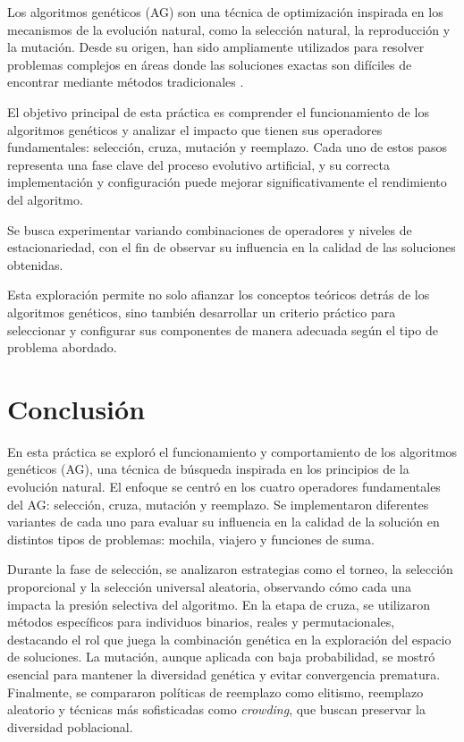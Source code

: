 \documentclass[12pt,twoside]{report}
\begin{document}
	Los algoritmos genéticos (AG) son una técnica de optimización inspirada en los mecanismos de la evolución natural, como la selección natural, la reproducción y la mutación. Desde su origen, han sido ampliamente utilizados para resolver problemas complejos en áreas donde las soluciones exactas son difíciles de encontrar mediante métodos tradicionales \cite{gas}.
	
	El objetivo principal de esta práctica es comprender el funcionamiento de los algoritmos genéticos y analizar el impacto que tienen sus operadores fundamentales: selección, cruza, mutación y reemplazo. Cada uno de estos pasos representa una fase clave del proceso evolutivo artificial, y su correcta implementación y configuración puede mejorar significativamente el rendimiento del algoritmo.
	
	Se busca experimentar variando combinaciones de operadores y niveles de estacionariedad, con el fin de observar su influencia en la calidad de las soluciones obtenidas.
	
	Esta exploración permite no solo afianzar los conceptos teóricos detrás de los algoritmos genéticos, sino también desarrollar un criterio práctico para seleccionar y configurar sus componentes de manera adecuada según el tipo de problema abordado.
	
	
	
	
	
	
	
	
	
	

	\chapter*{Conclusión}
	
	En esta práctica se exploró el funcionamiento y comportamiento de los algoritmos genéticos (AG), una técnica de búsqueda inspirada en los principios de la evolución natural. El enfoque se centró en los cuatro operadores fundamentales del AG: selección, cruza, mutación y reemplazo. Se implementaron diferentes variantes de cada uno para evaluar su influencia en la calidad de la solución en distintos tipos de problemas: mochila, viajero y funciones de suma.
	
	Durante la fase de selección, se analizaron estrategias como el torneo, la selección proporcional y la selección universal aleatoria, observando cómo cada una impacta la presión selectiva del algoritmo. En la etapa de cruza, se utilizaron métodos específicos para individuos binarios, reales y permutacionales, destacando el rol que juega la combinación genética en la exploración del espacio de soluciones. La mutación, aunque aplicada con baja probabilidad, se mostró esencial para mantener la diversidad genética y evitar convergencia prematura. Finalmente, se compararon políticas de reemplazo como elitismo, reemplazo aleatorio y técnicas más sofisticadas como \textit{crowding}, que buscan preservar la diversidad poblacional.
	
\end{document}
